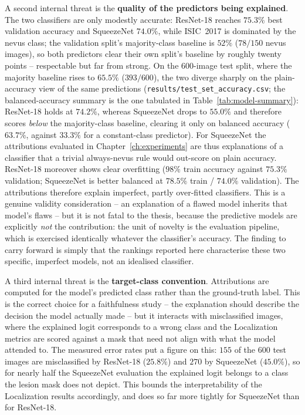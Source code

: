 A second internal threat is the \textbf{quality of the predictors being
explained}. The two classifiers are only modestly accurate: ResNet-18 reaches
$75.3\%$ best validation accuracy and SqueezeNet $74.0\%$, while ISIC~2017 is
dominated by the nevus class; the validation split's majority-class
baseline is $52\%$ ($78/150$ nevus images), so both predictors clear their
own split's baseline by roughly twenty points -- respectable but far from
strong. On the 600-image test split, where the majority baseline rises to
$65.5\%$ ($393/600$), the two diverge sharply on the plain-accuracy view
of the same predictions (\texttt{results/test\_set\_accuracy.csv}; the
balanced-accuracy summary is the one tabulated in
Table~\ref{tab:model-summary}): ResNet-18 holds at $74.2\%$, whereas
SqueezeNet drops to $55.0\%$ and therefore scores \emph{below} the
majority-class baseline, clearing it only on balanced accuracy
($63.7\%$, against $33.3\%$ for a constant-class predictor). For
SqueezeNet the attributions evaluated in Chapter~\ref{ch:experiments} are thus
explanations of a classifier that a trivial always-nevus rule would
out-score on plain accuracy. ResNet-18 moreover
shows clear overfitting ($98\%$ train accuracy against $75.3\%$ validation;
SqueezeNet is better balanced at $78.5\%$ train / $74.0\%$ validation). The
attributions therefore explain imperfect, partly over-fitted classifiers. This
is a genuine validity consideration -- an explanation of a flawed model inherits
that model's flaws -- but it is not fatal to the thesis, because the predictive
models are explicitly \emph{not} the contribution: the unit of novelty is the
evaluation pipeline, which is exercised identically whatever the classifier's
accuracy. The finding to carry forward is simply that the rankings reported here
characterise these two specific, imperfect models, not an idealised classifier.

A third internal threat is the \textbf{target-class convention}. Attributions
are computed for the model's predicted class rather than the ground-truth label.
This is the correct choice for a faithfulness study -- the explanation should
describe the decision the model actually made -- but it interacts with
misclassified images, where the explained logit corresponds to a wrong class and
the Localization metrics are scored against a mask that need not align with what
the model attended to. The measured error rates put a figure on this: $155$ of the
$600$ test images are misclassified by ResNet-18 ($25.8\%$) and $270$ by
SqueezeNet ($45.0\%$), so for nearly half the SqueezeNet evaluation the
explained logit belongs to a class the lesion mask does not depict. This
bounds the interpretability of the Localization results accordingly, and
does so far more tightly for SqueezeNet than for ResNet-18.

